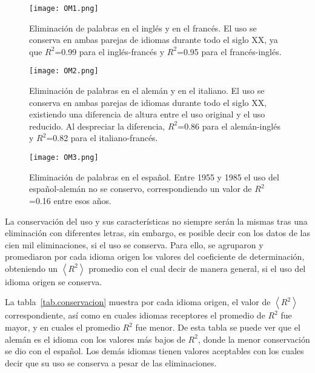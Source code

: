 



\begin{figure}[h!]
	\centering
	\texttt{[image: OM1.png]}
	\caption{Eliminación de palabras en el inglés y en el francés. El uso se conserva en ambas parejas de idiomas durante todo el siglo XX, ya que $R^{2}$=0.99 para el inglés-francés y $R^{2}$=0.95 para el francés-inglés.}
	\label{fig.OM1}
\end{figure}


\begin{figure}[h!]
	\centering
	\texttt{[image: OM2.png]}
	\caption{Eliminación de palabras en el alemán y en el italiano. El uso se conserva en ambas parejas de idiomas durante todo el siglo XX, existiendo una diferencia de altura entre el uso original y el uso reducido.  Al despreciar la diferencia, $R^{2}$=0.86 para el alemán-inglés y $R^{2}$=0.82 para el italiano-francés.}
	\label{fig.OM2}
\end{figure}

\begin{figure}[h!]
	\centering
	\texttt{[image: OM3.png]}
	\caption{Eliminación de palabras en el español. Entre 1955 y 1985 el uso del español-alemán no se conservo, correspondiendo un valor de $R^{2}$=0.16 entre esos años.}
	\label{fig.OM3}
\end{figure}


La conservación del uso y sus características no siempre serán la mismas tras una eliminación con diferentes letras, sin embargo, es posible decir 
con los datos de las cien mil eliminaciones, si el uso se conserva.  Para ello, se agruparon y promediaron por cada idioma origen  los valores del coeficiente de determinación, obteniendo un $\left \langle R^{2}  \right \rangle$  promedio con el cual decir de manera general, si el uso del idioma origen se conserva. 

La tabla~\ref{tab.conservacion} muestra por cada idioma origen,  el valor de $\left \langle R^{2}  \right \rangle$ correspondiente, así como  en cuales idiomas receptores el promedio de $R^{2}$ fue mayor, y en cuales el promedio $R^{2}$ fue menor. De esta tabla se puede ver que el alemán es el idioma con los valores más bajos de $R^{2}$, donde la menor conservación se dio con el español. Los demás idiomas tienen valores aceptables con los cuales decir que su uso se conserva a pesar de las eliminaciones. 

